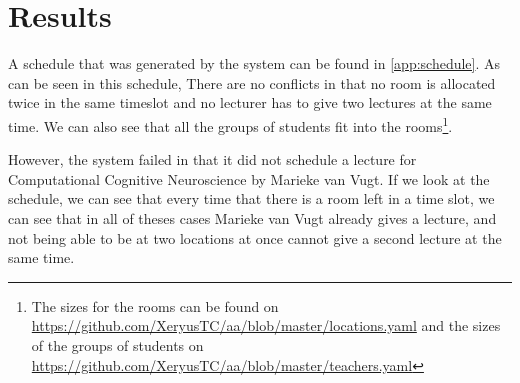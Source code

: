 \section{Results}
A schedule that was generated by the system can be found in
\autoref{app:schedule}. As can be seen in this schedule, There are no
conflicts in that no room is allocated twice in the same timeslot and no
lecturer has to give two lectures at the same time. We can also see that
all the groups of students fit into the rooms\footnote{The sizes for the
    rooms can be found on
    \url{https://github.com/XeryusTC/aa/blob/master/locations.yaml} and the
    sizes of the groups of students on
    \url{https://github.com/XeryusTC/aa/blob/master/teachers.yaml}}.

However, the system failed in that it did not schedule a lecture for
Computational Cognitive Neuroscience by Marieke van Vugt. If we look at
the schedule, we can see that every time that there is a room left in a
time slot, we can see that in all of theses cases Marieke van Vugt already
gives a lecture, and not being able to be at two locations at once cannot
give a second lecture at the same time. 
